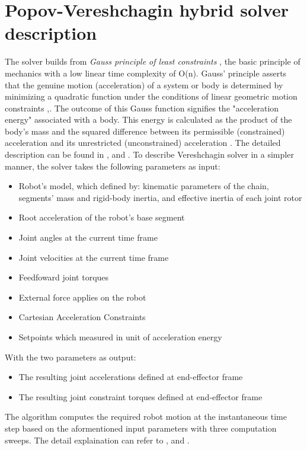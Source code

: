 \documentclass[report.tex]{subfiles}
\begin{document}
    \section{Popov-Vereshchagin hybrid solver description}
    The solver builds from \textit{Gauss principle of least constraints} , the basic principle of mechanics with a low linear time complexity of O(n). Gauss' principle asserts that the genuine motion (acceleration) of a system or body is determined by minimizing a quadratic function under the conditions of linear geometric motion constraints \cite{bruyninckx2000gauss},\cite{gauss1829neues}. The outcome of this Gauss function signifies the "acceleration energy" associated with a body. This energy is calculated as the product of the body's mass and the squared difference between its permissible (constrained) acceleration and its unrestricted (unconstrained) acceleration \cite{ramm2011principles}. The detailed description can be found in \cite{vereshchagin1989modeling},\cite{redon2002gauss} and \cite{popov1974control}. To describe Vereshchagin solver in a simpler manner, the solver takes the following parameters as input:
    \begin{itemize}
        \item Robot's model, which defined by: kinematic parameters of the chain, segments' mass and rigid-body inertia, and effective inertia of each joint rotor
        \item Root acceleration of the robot's base segment
        \item Joint angles at the current time frame
        \item Joint velocities at the current time frame
        \item Feedfoward joint torques
        \item External force applies on the robot
        \item Cartesian Acceleration Constraints
        \item Setpoints which measured in unit of acceleration energy
    \end{itemize}
    With the two parameters as output:
    \begin{itemize}
        \item The resulting joint accelerations defined at end-effector frame
        \item The resulting joint constraint torques defined at end-effector frame
    \end{itemize}
    The algorithm computes the required robot motion at the instantaneous time step based on the aformentioned input parameters with three computation sweeps. The detail explaination can refer to \cite{vereshchagin1989modeling} ,\cite{schneider2019exploiting} and \cite{kulkarni2019applying}.
\end{document}

